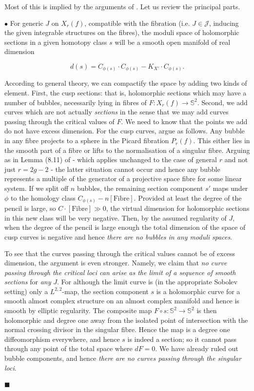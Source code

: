 \documentclass[10pt]{article}
\newcommand{\sss}{\mathbb{S}}
\newcommand{\Fibre}{\mathrm{Fibre}}
\newenvironment{Pf}{\par \noindent{\sc Proof:} }{\quad $\blacksquare$ \par
\vspace{0.5cm}}
\begin{document}
\begin{Pf}
Most of this is implied by the arguments of
\cite{SKDIS}. Let us review the
principal parts.  

\vspace{0.2cm}

\noindent $\bullet$ For generic $J$ on $X_r(f)$, compatible with
the fibration (i.e. $J \in \mathcal{J}$, inducing the given integrable
structures on the 
fibres), the moduli space of holomorphic sections in a given homotopy
class $s$ will be a smooth open manifold of real dimension 

$$d(s) = C_{\phi(s)}\cdot C_{\phi(s)} - K_{X'} \cdot C_{\phi(s)}.$$

\noindent According to general theory, we can compactify the space by
adding two kinds of element.
First, the cusp sections:  that
is, holomorphic sections which may have a number of bubbles,
necessarily lying in fibres of $F: X_r(f) \rightarrow \sss^2$. Second,
we add curves
which are not actually \emph{sections} in the sense that we may add
curves passing through the critical values of $F$.  We need to know
that the points we add do not have excess dimension.  For the cusp
curves, argue as follows.  Any bubble in any fibre projects to a sphere in
the Picard fibration $P_r(f)$.  This either lies in the smooth part of
a fibre or lifts
to the normalisation of a singular fibre.  Arguing as in 
Lemma (8.11) of \cite{SKDIS} - which applies unchanged to the case of
general $r$ and not just $r=2g-2$ - the latter situation cannot occur
and hence any bubble represents a
multiple of the generator of a projective space fibre for some linear
system.  If we split off $n$ bubbles, the remaining section component
$s'$ maps under $\phi$ to the homology class $C_{\phi(s)} -
n[\Fibre]$.  Provided at least the degree of the pencil is large, so
$C \cdot [\Fibre] \gg 0$, the virtual dimension for holomorphic
sections in this new class will be very negative.  Then, by
the assumed regularity of $J$, when the degree
of the pencil is large enough the total
dimension of the space of cusp curves is negative and hence
\emph{there are no bubbles in any moduli spaces}. 

\vspace{0.2cm}

\noindent To see that the curves passing through the
critical values cannot be of excess dimension, the argument is even
stronger.  Namely, we claim that
\emph{no curve passing through the critical loci can arise as the
  limit of a sequence of smooth sections} for \emph{any} $J$.  For
although the limit
curve is (in the appropriate Sobolev setting) only a $L^{2,2}$-map,
the section component $s$ is a holomorphic curve for a smooth almost
complex structure on an almost complex manifold and hence is smooth by
elliptic regularity.  The composite map $F \circ s: \sss^2 \rightarrow
\sss^2$ is then holomorphic and degree one away from the
isolated point of intersection with the normal crossing divisor in the
singular fibre.  Hence the map is a degree one diffeomorphism
everywhere, and hence $s$
is indeed a section; so it cannot pass through any point of the total
space where $dF=0$.  We have already ruled out bubble components, and
hence \emph{there are no curves passing through the singular loci}.


\end{Pf}
\end{document}
